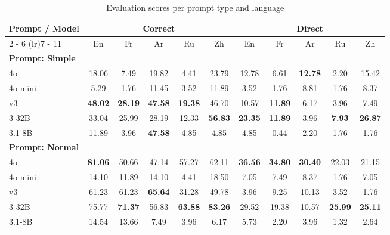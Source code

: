 \documentclass{article}%
\begin{document}
%
\normalsize%


\begin{table}[h!]%
\centering%
\setlength{\tabcolsep}{5pt}%
\begin{tabular}{@{}lcccccccccc@{}}%
\toprule%
\textbf{Prompt / Model} & \multicolumn{5}{c}{\textbf{Correct}} & \multicolumn{5}{c}{\textbf{Direct}}\\%
\cmidrule(lr){2%
-%
6}%
\cmidrule(lr){7%
-%
11}%
&En&Fr&Ar&Ru&Zh&En&Fr&Ar&Ru&Zh\\%
\midrule%
\multicolumn{11}{l}{\textbf{Prompt: Simple}} \\%
\openai{} 4o&18.06&7.49&19.82&4.41&23.79&12.78&6.61&\textbf{12.78}&2.20&15.42\\%
\openai{} 4o-mini&5.29&1.76&11.45&3.52&11.89&3.52&1.76&8.81&1.76&8.37\\%
\deepseek{} v3&\textbf{48.02}&\textbf{28.19}&\textbf{47.58}&\textbf{19.38}&46.70&10.57&\textbf{11.89}&6.17&3.96&7.49\\%
\qwen{} 3-32B&33.04&25.99&28.19&12.33&\textbf{56.83}&\textbf{23.35}&\textbf{11.89}&3.96&\textbf{7.93}&\textbf{26.87}\\%
\meta{} 3.1-8B&11.89&3.96&\textbf{47.58}&4.85&4.85&4.85&0.44&2.20&1.76&1.76\\%
\midrule%
\multicolumn{11}{l}{\textbf{Prompt: Normal}} \\%
\openai{} 4o&\textbf{81.06}&50.66&47.14&57.27&62.11&\textbf{36.56}&\textbf{34.80}&\textbf{30.40}&22.03&21.15\\%
\openai{} 4o-mini&14.10&11.89&14.10&4.41&18.50&7.05&7.49&8.37&1.76&7.05\\%
\deepseek{} v3&61.23&61.23&\textbf{65.64}&31.28&49.78&3.96&9.25&10.13&3.52&1.76\\%
\qwen{} 3-32B&75.77&\textbf{71.37}&56.83&\textbf{63.88}&\textbf{83.26}&29.52&19.38&10.57&\textbf{25.99}&\textbf{25.11}\\%
\meta{} 3.1-8B&14.54&13.66&7.49&3.96&6.17&5.73&2.20&3.96&1.32&2.64\\\bottomrule%
%
\end{tabular}%
\caption{Evaluation scores per prompt type and language}%
\end{table}

%
\end{document}
